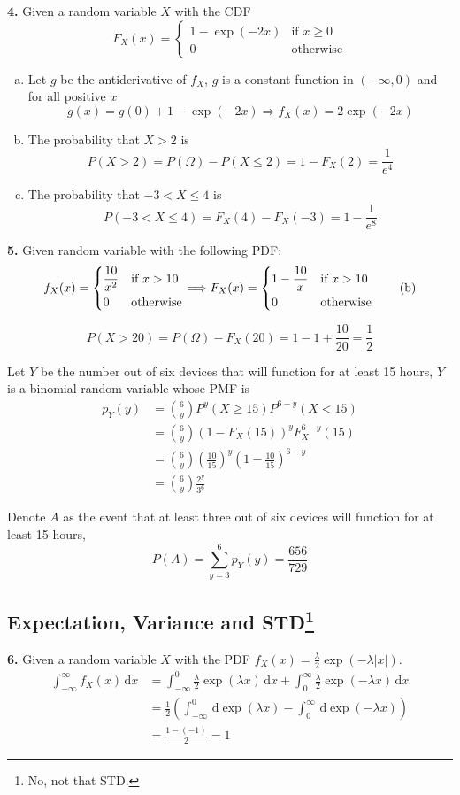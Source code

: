 \documentclass[a4paper,12pt]{article}
\newcommand{\ud}{\,\mathrm{d}}
\newcommand{\exercise}[1]{\noindent\textbf{#1.}}
\begin{document}
\exercise 4 Given a random variable $X$ with the CDF
\[F_X(x) = \begin{cases}
    1 - \exp(-2x) &\text{if } x \ge 0\\
    0 &\text{otherwise}
  \end{cases}\]
\begin{enumerate}[(a)]
  \item Let $g$ be the antiderivative of $f_X$, $g$ is a constant function
    in $(-\infty, 0)$ and for all positive $x$
    \[g(x) = g(0) + 1 - \exp(-2x)
      \Longrightarrow f_X(x) = 2\exp(-2x)\]
  \item The probability that $X > 2$ is
    \[P(X > 2) = P(\Omega) - P(X \le 2) = 1 - F_X(2) = \frac{1}{e^4}\]
  \item The probability that $-3 < X \le 4$ is
    \[P(-3 < X \le 4) = F_X(4) - F_X(-3) = 1 - \frac{1}{e^8}\]
\end{enumerate}

\exercise 5  Given random variable with the following PDF:
\[f_X(x) = \begin{dcases}
  \frac{10}{x^2} &\text{if }x > 10\\
  0 &\text{otherwise}
\end{dcases}
\Longrightarrow F_X(x) = \begin{dcases}
  1 - \frac{10}{x} &\text{if }x > 10\\
  0 &\text{otherwise}
\end{dcases}\tag{b}\]

\[P(X > 20) = P(\Omega) - F_X(20) = 1 - 1 + \frac{10}{20} = \frac{1}{2}\tag{a}\]

Let $Y$ be the number out of six devices that will function for at least
15 hours, $Y$ is a binomial random variable whose PMF is
\begin{align*}
  p_Y(y) &= \binom{6}{y} P^y(X \ge 15) P^{6-y}(X < 15)\\
  &= \binom{6}{y} \left(1 - F_X(15)\right)^y F_X^{6-y}(15)\\
  &= \binom{6}{y} \left(\frac{10}{15}\right)^y
     \left(1 - \frac{10}{15}\right)^{6-y}\\
  &= \binom{6}{y} \frac{2^y}{3^6}
\end{align*}

Denote $A$ as the event that at least three out of six devices will function
for at least 15 hours,
\[P(A) = \sum_{y=3}^6 p_Y(y) = \frac{656}{729}\tag{c}\]

\subsection{Expectation, Variance and STD\protect\footnote{No, not that STD.}}
\exercise 6  Given a random variable $X$ with the PDF
$f_X(x) = \frac{\lambda}{2}\exp(-\lambda|x|)$.
\begin{align*}
  \int_{-\infty}^\infty f_X(x)\ud x
  &= \int_{-\infty}^0 \frac{\lambda}{2}\exp(\lambda x)\ud x
   + \int_0^\infty \frac{\lambda}{2}\exp(-\lambda x)\ud x\\
  &= \frac{1}{2}\left(\int_{-\infty}^0\ud\exp(\lambda x)
   - \int_0^\infty\ud\exp(-\lambda x)\right)\\
  &= \frac{1 - (-1)}{2} = 1
\end{align*}
\end{document}
